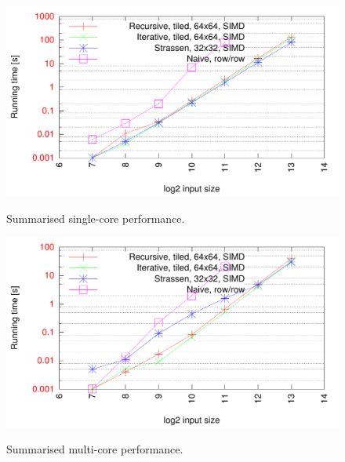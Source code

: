 \begin{figure}[h!]
  \centering
  \includegraphics[width=\textwidth]{"../project2/gnuplots/best_single"}
  \label{fig:best_single}
  \caption{Summarised single-core performance.}
\end{figure}

\begin{figure}[h!]
  \centering
  \includegraphics[width=\textwidth]{"../project2/gnuplots/best_parallel"}
  \label{fig:best_parallel}
  \caption{Summarised multi-core performance.}
\end{figure}